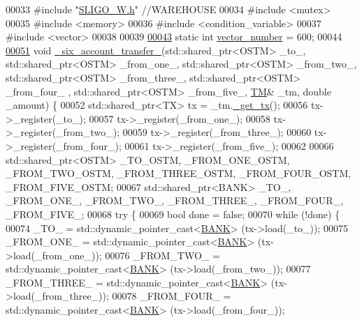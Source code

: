 \begin{DoxyCode}
00033 \textcolor{preprocessor}{#include "\hyperlink{_s_l_i_g_o___w_8h}{SLIGO\_W.h}"}     \textcolor{comment}{//WAREHOUSE}
00034 \textcolor{preprocessor}{#include <mutex>}
00035 \textcolor{preprocessor}{#include <memory>}
00036 \textcolor{preprocessor}{#include <condition\_variable>}
00037 \textcolor{preprocessor}{#include <vector>}
00038 
00039 
\hypertarget{main_8cpp_source.tex_l00043}{}\hyperlink{main_8cpp_a988177ecdd12249ecd3a1cdc75546c44_a988177ecdd12249ecd3a1cdc75546c44}{00043} \textcolor{keyword}{static} \textcolor{keywordtype}{int} \hyperlink{main_8cpp_a988177ecdd12249ecd3a1cdc75546c44_a988177ecdd12249ecd3a1cdc75546c44}{vector\_number} = 600;
00044 
\hypertarget{main_8cpp_source.tex_l00051}{}\hyperlink{main_8cpp_a944b67b9489cc68c8eac66d42f4515ec_a944b67b9489cc68c8eac66d42f4515ec}{00051} \textcolor{keywordtype}{void} \hyperlink{main_8cpp_a944b67b9489cc68c8eac66d42f4515ec_a944b67b9489cc68c8eac66d42f4515ec}{\_six\_account\_transfer\_}(std::shared\_ptr<OSTM> \_to\_, std::shared\_ptr<OSTM> 
      \_from\_one\_, std::shared\_ptr<OSTM> \_from\_two\_, std::shared\_ptr<OSTM> \_from\_three\_, std::shared\_ptr<OSTM> \_from\_four\_
      , std::shared\_ptr<OSTM> \_from\_five\_, \hyperlink{class_t_m}{TM}& \_tm, \textcolor{keywordtype}{double} \_amount) \{
00052     std::shared\_ptr<TX> tx = \_tm.\hyperlink{class_t_m_a41cb0226cc4080c931651b13f74a0075_a41cb0226cc4080c931651b13f74a0075}{\_get\_tx}();
00056     tx->\_register(\_to\_);
00057     tx->\_register(\_from\_one\_);
00058     tx->\_register(\_from\_two\_);
00059     tx->\_register(\_from\_three\_);
00060     tx->\_register(\_from\_four\_);
00061     tx->\_register(\_from\_five\_);
00062 
00066     std::shared\_ptr<OSTM> \_TO\_OSTM, \_FROM\_ONE\_OSTM, \_FROM\_TWO\_OSTM, \_FROM\_THREE\_OSTM, \_FROM\_FOUR\_OSTM, 
      \_FROM\_FIVE\_OSTM;
00067     std::shared\_ptr<BANK> \_TO\_, \_FROM\_ONE\_, \_FROM\_TWO\_, \_FROM\_THREE\_, \_FROM\_FOUR\_, \_FROM\_FIVE\_;
00068     \textcolor{keywordflow}{try} \{
00069         \textcolor{keywordtype}{bool} done = \textcolor{keyword}{false};
00070         \textcolor{keywordflow}{while} (!done) \{
00074             \_TO\_ = std::dynamic\_pointer\_cast<\hyperlink{class_b_a_n_k}{BANK}> (tx->load(\_to\_));
00075             \_FROM\_ONE\_ = std::dynamic\_pointer\_cast<\hyperlink{class_b_a_n_k}{BANK}> (tx->load(\_from\_one\_));
00076             \_FROM\_TWO\_ = std::dynamic\_pointer\_cast<\hyperlink{class_b_a_n_k}{BANK}> (tx->load(\_from\_two\_));
00077             \_FROM\_THREE\_ = std::dynamic\_pointer\_cast<\hyperlink{class_b_a_n_k}{BANK}> (tx->load(\_from\_three\_));
00078             \_FROM\_FOUR\_ = std::dynamic\_pointer\_cast<\hyperlink{class_b_a_n_k}{BANK}> (tx->load(\_from\_four\_));

\end{DoxyCode}
